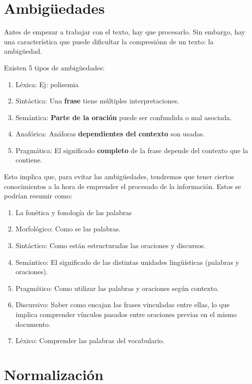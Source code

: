 \documentclass{report}
\begin{document}
\section{Ambigüedades}
Antes de empezar a trabajar con el texto, hay que procesarlo.
Sin embargo, hay una característica que puede dificultar la compresiónn de un texto: la ambigüedad.

Existen 5 tipos de ambigüedades:
\begin{enumerate}
    \item {Léxica:}        Ej: polisemia
    \item {Sintáctica:}    Una \textbf{frase} tiene múltiples interpretaciones. 
    \item {Semántica:}     \textbf{Parte de la oración} puede ser confundida o mal asociada.
    \item {Anafórica:}     Anáforas \textbf{dependientes del contexto} son usadas.
    \item {Pragmática:}     El significado \textbf{completo} de la frase depende del contexto que la contiene.
\end{enumerate}

Esto implica que, para evitar las ambigüedades, 
tendremos que tener ciertos conocimientos a la hora de emprender el procesado de la información.
Estos se podrían resumir como:

\begin{enumerate}
    \item La fonética y fonología de las palabras
    \item{Morfológico:} Como se  las palabras.
    \item{Sintáctico:} Como están estructuradas las oraciones y discursos.
    \item{Semántico:} El significado de las distintas unidades lingüísticas (palabras y oraciones).
    \item{Pragmático:} Como utilizar las palabras y oraciones según contexto.
    \item{Discursivo:} Saber como encajan las frases vinculadas entre ellas, lo que implica comprender vínculos pasados entre oraciones previas en el mismo documento.
    \item{Léxico:} Comprender las palabras del vocabulario.
\end{enumerate}

\section{Normalización}
\end{document}

